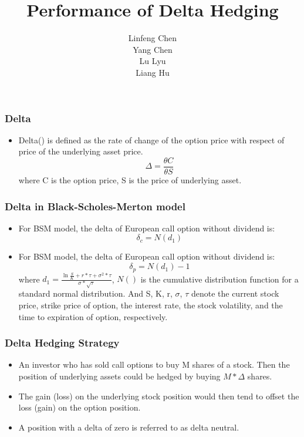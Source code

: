 \documentclass[cjk]{beamer}
\begin{document}
\begin{CJK*}{UTF8}{gbsn}
\title{Performance of Delta Hedging}
\author[Group 5]{ Linfeng Chen \\ Yang Chen\\ Lu Lyu \\ Liang Hu\\}

\begin{frame}
\titlepage
\end{frame}

\begin{frame}
\frametitle{Delta}
\begin{itemize}
\item Delta() is defined as the rate of change of the option price with respect of price of the underlying asset price. $$
\Delta= \frac{\theta{C}}{\theta{S}}
$$
where C is the option price, S is the price of underlying asset.
\end{itemize}
\end{frame}

\begin{frame}
\frametitle{Delta in Black-Scholes-Merton model}
\begin{itemize}
\item For BSM model, the delta of European call option without dividend is:
$$ \delta_{c}=N(d_{1}) $$
\item For BSM model, the delta of European call option without dividend is:
$$ \delta_{p}=N(d_{1})-1 $$
where  $ d_{1}=\frac{\ln \frac{S}{K} + r*\tau+ \sigma^2 * \tau}{\sigma*\sqrt{ \tau}} $, $N()$ 
is the cumulative distribution function for a standard normal distribution. And S, K, r, $\sigma$, $\tau$ denote the current stock price, strike price of option, the interest rate, the stock volatility, and the time to expiration of option, respectively.
\end{itemize}
\end{frame}


\begin{frame}
\frametitle{Delta Hedging Strategy}
\begin{itemize}
\item An investor who has sold call options to buy M shares of a stock. Then the position of underlying assets could be hedged by buying $ M*\Delta $ shares. 
\item The gain (loss) on the underlying stock position would then tend to offset the loss (gain) on the option position. 
\item A position with a delta of zero is referred to as delta neutral.
\end{itemize}
\end{frame}



\end{CJK*}
\end{document}
